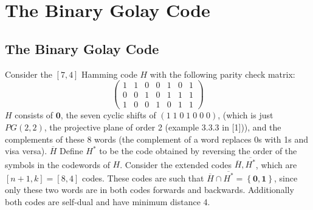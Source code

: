 \documentclass{article}
\newcommand{\ext}[1]{\overline{#1}}
\renewcommand{\=}{\equiv}
\newcommand{\set}[1]{\left\{ #1 \right\}}
\renewcommand{\v}{\mathbf}
\theoremstyle{plain}
\theoremstyle{definition}
\newtheorem{exmp}{Example}[subsection]
\begin{document}



\section{The Binary Golay Code}


\subsection{The Binary Golay Code}

Consider the $[7,4]$ Hamming code $H$ with the following parity check matrix:
$$ \begin{pmatrix}
  1 & 1 & 0 & 0 & 1 & 0 & 1 \\
  0 & 0 & 1 & 0 & 1 & 1 & 1 \\
  1 & 0 & 0 & 1 & 0 & 1 & 1
\end{pmatrix} $$
$H$ consists of $\v 0$, the seven cyclic shifts of $(1\;1\;0\;1\;0\;0\;0)$, (which is just $PG(2,2)$, the projective plane of order 2 (example 3.3.3 in [1])), and the complements of these 8 words (the complement of a word replaces 0s with 1s and visa versa).
$\ext{H}$
Define $H^*$ to be the code obtained by reversing the order of the symbols in the codewords of $H$.
Consider the extended codes $\ext{H}, \ext{H^*}$, which are $[n+1, k] = [8,4]$ codes.
These codes are such that $\ext{H} \cap \ext{H^*} = \set{ \v 0, \v 1 }$, since only these two words are in both codes forwards and backwards. Additionally both codes are self-dual and have minimum distance 4.
\end{document}
